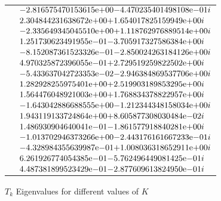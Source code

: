 \begin{enumerate}
\begin{figure}[tbh]
\begin{tabular}{ |p{1cm}|| p{10cm}|}
  & ${-2.816575470153615}\mathrm{e}{+00}  {- 4.470235401498108}\mathrm{e}{-01i}$\\
  & ${ 2.304844231638672}\mathrm{e}{+00}  {+ 1.654017825159949}\mathrm{e}{+00i}$\\
  & ${-2.335649345045510}\mathrm{e}{+00}  {+ 1.118762976889514}\mathrm{e}{+00i}$\\
  & ${ 1.251730623491955}\mathrm{e}{-01}  {- 3.705917327586384}\mathrm{e}{+00i}$\\
  & ${-8.152087361523326}\mathrm{e}{-01}  {- 2.850024263184126}\mathrm{e}{+00i}$\\
  & ${ 4.970325872396055}\mathrm{e}{-01}  {+ 2.729519259822502}\mathrm{e}{+00i}$\\
  & ${-5.433637042723353}\mathrm{e}{-02}  {- 2.946384869537706}\mathrm{e}{+00i}$\\
  & ${ 1.282928255975401}\mathrm{e}{+00}  {+ 2.519903189853295}\mathrm{e}{+00i}$\\
  & ${ 1.564476048921003}\mathrm{e}{+00}  {+ 1.768834378822957}\mathrm{e}{+00i}$\\
  & ${-1.643042886688555}\mathrm{e}{+00}  {- 1.212344348158034}\mathrm{e}{+00i}$\\
  & ${ 1.943119133724864}\mathrm{e}{+00}  {+ 8.605877308030484}\mathrm{e}{-02i}$\\
  & ${ 1.486930904640041}\mathrm{e}{-01}  {- 1.861577918840281}\mathrm{e}{+00i}$\\
  & ${-1.013702946373266}\mathrm{e}{+00}  {- 2.443176161667233}\mathrm{e}{-01i}$\\
  & ${-4.328984355639987}\mathrm{e}{-01}  {+ 1.008036318652911}\mathrm{e}{+00i}$\\
  & ${ 6.261926774054385}\mathrm{e}{-01}  {- 5.762496449081425}\mathrm{e}{-01i}$\\
  & ${ 4.487381899523429}\mathrm{e}{-01}  {- 2.877609613824950}\mathrm{e}{-01i}$\\
\hline  
\end{tabular} 
\caption{$T_{k}$ Eigenvalues for different values of $K$}
   \label{tab:t_k_eig}
\end{figure} 


\end{enumerate}